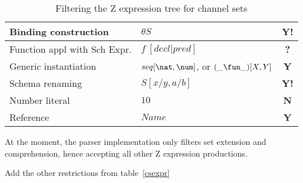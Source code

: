 \documentclass{article}
\begin{document}
\begin{table}[h]
\begin{tabular}{|l|l|c|}
\hline
Binding construction & $\theta S$ & \textbf{Y!} \\
\hline
Function appl with Sch Expr. & $f~[ decl | pred ]$ & \textbf{?} \\
\hline
Generic instantiation & $seq[\nat, \num]$, or $(\_ \fun \_)[X, Y]$ & \textbf{Y} \\
\hline
Schema renaming & $S[x/y, a/b]$ & \textbf{Y!} \\
\hline
Number literal & $10$ & \textbf{N} \\
\hline
Reference & $Name$ & \textbf{Y} \\
\hline
\end{tabular}
\caption{Filtering the Z expression tree for channel sets}
\end{table}
%
At the moment, the parser implementation only filters set extension and comprehension, hence
accepting all other Z expression productions.

\begin{issue}
   Add the other restrictions from table~\ref{csexpr}
\end{issue}

%
%
%
%
%
%
\end{document}
